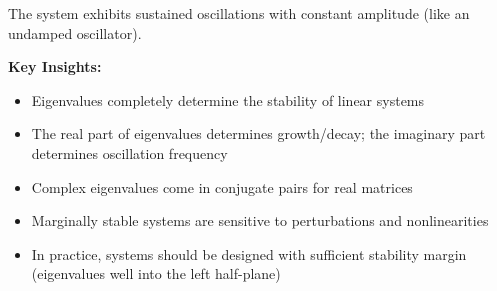 \documentclass[11pt,a4paper]{article}
\begin{document}
The system exhibits sustained oscillations with constant amplitude (like an undamped oscillator).

\textbf{Key Insights:}
\begin{itemize}
  \item Eigenvalues completely determine the stability of linear systems
  \item The real part of eigenvalues determines growth/decay; the imaginary part determines oscillation frequency
  \item Complex eigenvalues come in conjugate pairs for real matrices
  \item Marginally stable systems are sensitive to perturbations and nonlinearities
  \item In practice, systems should be designed with sufficient stability margin (eigenvalues well into the left half-plane)
\end{itemize}
\end{document}
